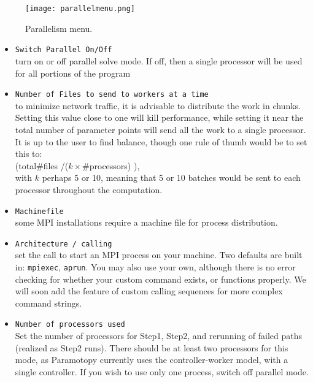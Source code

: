 \begin{figure}[h]
\begin{center}
\texttt{[image: parallelmenu.png]}
\caption[Parallelism Menu]{Parallelism menu.}
\label{screen:parallelmenu}
\end{center}
\end{figure}

\begin{itemize}
	\item \texttt{Switch Parallel On/Off}  \\turn on or off parallel solve mode.  If off, then a single processor will be used for all portions of the program
	
	\item \texttt{Number of Files to send to workers at a time}\\ to minimize network traffic, it is advisable to distribute the work in chunks.  Setting this value close to one will kill performance, while setting it near the total number of parameter points will send all the work to a single processor.  It is up to the user to find balance, though one rule of thumb would be to set this to:   \\ \hspace{2in} (total\#files /($k \times $\#processors) ), \\with $k$ perhaps 5 or 10, meaning that 5 or 10 batches would be sent to each processor throughout the computation.
	
	\item \texttt{Machinefile} \\ some MPI installations require a machine file for process distribution.
	
	\item \texttt{Architecture / calling} \\ set the call to start an MPI process on your machine.  Two defaults are built in: \texttt{mpiexec}, \texttt{aprun}.  You may also use your own, although there is no error checking for whether your custom command exists, or functions properly.  We will soon add the feature of custom calling sequences for more complex command strings.
	
	\item \texttt{Number of processors used} \\ Set the number of processors for Step1, Step2, and rerunning of failed paths (realized as Step2 runs).  There should be at least two processors for this mode, as Paramotopy currently uses the controller-worker model, with a single controller.  If you wish to use only one process, switch off parallel mode.  
	


\end{itemize}


